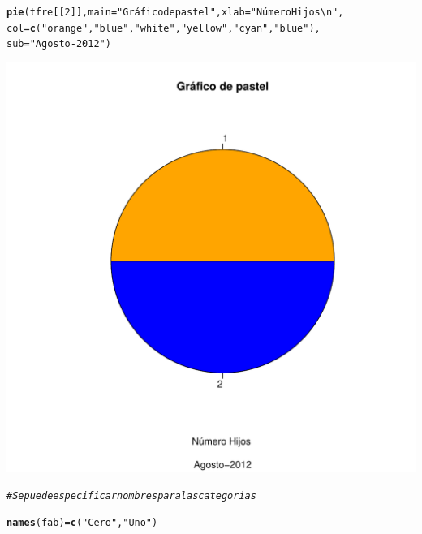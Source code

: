 \documentclass[12pt,letterpaper]{article}\usepackage[]{graphicx}\usepackage[]{color}
\makeatletter
\def\maxwidth{ %
  \ifdim\Gin@nat@width>\linewidth
    \linewidth
  \else
    \Gin@nat@width
  \fi
}
\newcommand{\hlnum}[1]{\textcolor[rgb]{0.686,0.059,0.569}{#1}}%
\newcommand{\hlstr}[1]{\textcolor[rgb]{0.192,0.494,0.8}{#1}}%
\newcommand{\hlcom}[1]{\textcolor[rgb]{0.678,0.584,0.686}{\textit{#1}}}%
\newcommand{\hlstd}[1]{\textcolor[rgb]{0.345,0.345,0.345}{#1}}%
\newcommand{\hlkwb}[1]{\textcolor[rgb]{0.69,0.353,0.396}{#1}}%
\newcommand{\hlkwc}[1]{\textcolor[rgb]{0.333,0.667,0.333}{#1}}%
\newcommand{\hlkwd}[1]{\textcolor[rgb]{0.737,0.353,0.396}{\textbf{#1}}}%
\newenvironment{kframe}{%
 \def\at@end@of@kframe{}%
 \ifinner\ifhmode%
  \def\at@end@of@kframe{\end{minipage}}%
  \begin{minipage}{\columnwidth}%
 \fi\fi%
 \def\FrameCommand##1{\hskip\@totalleftmargin \hskip-\fboxsep
 \colorbox{shadecolor}{##1}\hskip-\fboxsep
     \hskip-\linewidth \hskip-\@totalleftmargin \hskip\columnwidth}%
 \MakeFramed {\advance\hsize-\width
   \@totalleftmargin\z@ \linewidth\hsize
   \@setminipage}}%
 {\par\unskip\endMakeFramed%
 \at@end@of@kframe}
\newenvironment{knitrout}{}{} %
\makeatother
\begin{document}
\begin{enumerate}
\begin{knitrout}
\begin{kframe}
\begin{alltt}
\hlkwd{pie}\hlstd{(tfre[[}\hlnum{2}\hlstd{]],} \hlkwc{main}\hlstd{=}\hlstr{"Gráfico de pastel"}\hlstd{,} \hlkwc{xlab}\hlstd{=}\hlstr{"Número Hijos \textbackslash{}n"}\hlstd{,}
    \hlkwc{col}\hlstd{=}\hlkwd{c}\hlstd{(}\hlstr{"orange"}\hlstd{,} \hlstr{"blue"}\hlstd{,} \hlstr{"white"}\hlstd{,} \hlstr{"yellow"}\hlstd{,} \hlstr{"cyan"}\hlstd{,} \hlstr{"blue"}\hlstd{),}
    \hlkwc{sub}\hlstd{=}\hlstr{"Agosto-2012"}\hlstd{)}
\end{alltt}
\end{kframe}
\includegraphics[width=\maxwidth]{figure/unnamed-chunk-25-1} 

\end{knitrout}

\begin{knitrout}
\color{fgcolor}\begin{kframe}
\begin{alltt}
\hlcom{# Se puede especificar nombres para las categorias }

\hlkwd{names}\hlstd{(fab)} \hlkwb{=} \hlkwd{c}\hlstd{(}\hlstr{"Cero"}\hlstd{,} \hlstr{"Uno"}\hlstd{)}


\end{alltt}
\end{kframe}
\end{knitrout}
\end{enumerate}
\end{document}
